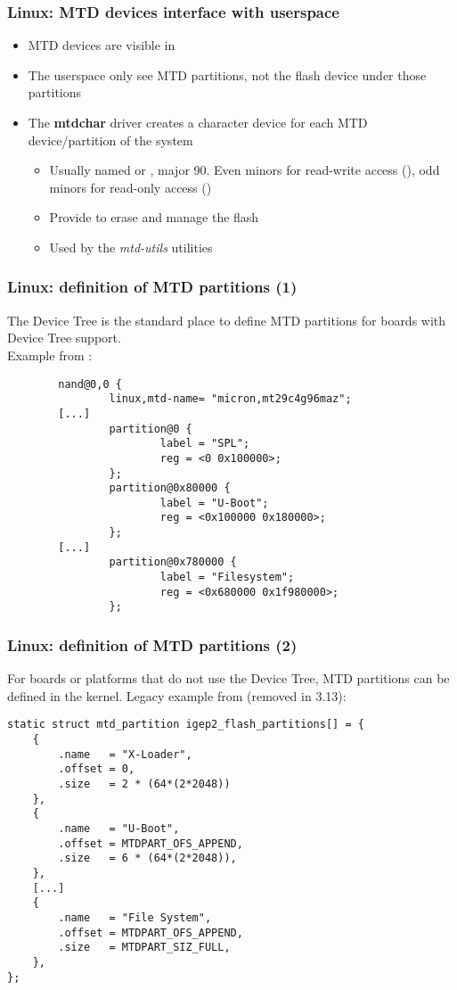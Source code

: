 \begin{frame}
  \frametitle{Linux: MTD devices interface with userspace}
  \begin{itemize}
  \item MTD devices are visible in 
  \item The userspace only see MTD partitions, not the flash device
    under those partitions
  \item The {\bf mtdchar} driver creates a character device for each
    MTD device/partition of the system
    \begin{itemize}
    \item Usually named  or , major 90.
      Even minors for read-write access (),
      odd minors for read-only access ()
    \item Provide  to erase and manage the flash
    \item Used by the {\em mtd-utils} utilities
    \end{itemize}
  \end{itemize}
\end{frame}


\begin{frame}[fragile]
  \frametitle{Linux: definition of MTD partitions (1)}
  The Device Tree is the standard place to define MTD partitions
  for boards with Device Tree support.\\
  Example from :
\begin{verbatim}
        nand@0,0 {
                linux,mtd-name= "micron,mt29c4g96maz";
		[...]
                partition@0 {
                        label = "SPL";
                        reg = <0 0x100000>;
                };
                partition@0x80000 {
                        label = "U-Boot";
                        reg = <0x100000 0x180000>;
                };
		[...]
                partition@0x780000 {
                        label = "Filesystem";
                        reg = <0x680000 0x1f980000>;
                };
\end{verbatim}
\end{frame}

\begin{frame}[fragile]
  \frametitle{Linux: definition of MTD partitions (2)}
  For boards or platforms that do not use the Device Tree,
  MTD partitions can be defined in the kernel.
  Legacy example from 
  (removed in 3.13):
\begin{verbatim}
static struct mtd_partition igep2_flash_partitions[] = {
    {
        .name   = "X-Loader",
        .offset = 0,
        .size   = 2 * (64*(2*2048))
    },
    {
        .name   = "U-Boot",
        .offset = MTDPART_OFS_APPEND,
        .size   = 6 * (64*(2*2048)),
    },
    [...]
    {
        .name   = "File System",
        .offset = MTDPART_OFS_APPEND,
        .size   = MTDPART_SIZ_FULL,
    },
};
\end{verbatim}
\end{frame}

